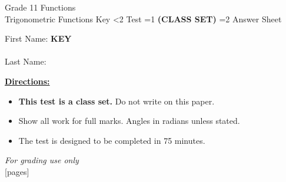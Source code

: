 \documentclass[addpoints]{exam}
\newcommand{\event}{Trigonometric Functions}
\newcommand{\tournament}{}
\def\type{0}
\begin{document}
\begin{center}
    {\huge Grade 11 Functions \\ \event
    \ifprintanswers \space Key
    \else \space \ifnum\type<2 Test \fi \ifnum\type=1 \textbf{(CLASS SET)} \fi
          \ifnum\type=2 Answer Sheet \fi
    \fi \\ \vspace{3mm}\tournament\vspace{1mm}}
\end{center}

\vspace{.25\textheight}

\begin{center}
    First Name: \ifprintanswers
    \underline{\hspace{3.5cm}}\textbf{KEY}\underline{\hspace{5.5cm}}\\\vspace{5mm}
    \else \underline{\hspace{10cm}}\\ \vspace{5mm} \fi
    Last Name: \underline{\hspace{10cm}}\\ \vspace{5mm}
\end{center}

\noindent\textbf{\underline{Directions:}}
\begin{itemize}
    \ifnum\type=1 \item \textbf{This test is a class set.} Do not write on this paper. \fi
    \item Show all work for full marks. Angles in radians unless stated.
    \item The test is designed to be completed in 75 minutes.
\end{itemize}
\begin{center}
\textit{For grading use only}\\
[pages]
\end{center}
\end{document}
